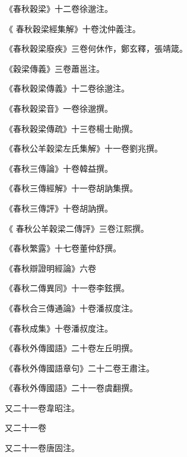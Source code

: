 \begin{pinyinscope}
 《春秋穀梁》十二卷徐邈注。



 《
 春秋穀梁經集解》十卷沈仲義注。



 《春秋穀梁廢疾》三卷何休作，鄭玄釋，張靖箴。



 《穀梁傳義》三卷蕭邕注。



 《春秋穀梁傳義》十二卷徐邈注。



 《春秋穀梁音》一卷徐邈撰。



 《春秋穀梁傳疏》十三卷楊士勛撰。



 《春秋公羊穀梁左氏集解》十一卷劉兆撰。



 《春秋三傳論》十卷韓益撰。



 《春秋三傳經解》十一卷胡訥集撰。



 《春秋三傳評》十卷胡訥撰。



 《
 春秋公羊穀梁二傳評》三卷江熙撰。



 《春秋繁露》十七卷董仲舒撰。



 《春秋辯證明經論》六卷



 《春秋二傳異同》十一卷李鉉撰。



 《春秋合三傳通論》十卷潘叔度注。



 《春秋成集》十卷潘叔度注。



 《春秋外傳國語》二十卷左丘明撰。



 《春秋外傳國語章句》二十二卷王肅注。



 《春秋外傳國語》二十一卷虞翻撰。



 又二十一卷韋昭注。



 又二十一卷



 又二十一卷唐固注。




\end{pinyinscope}
